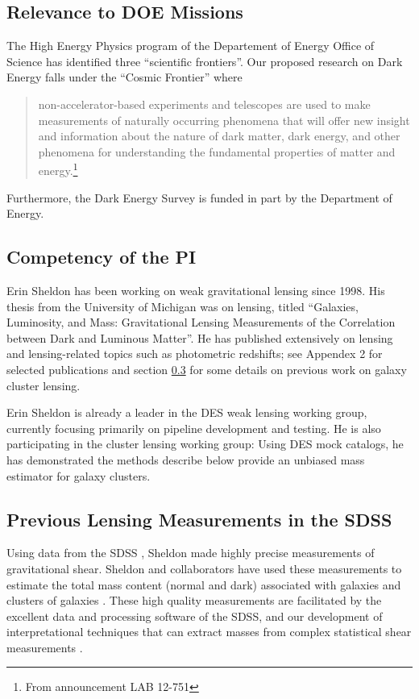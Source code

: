 \documentclass[12pt]{article}
\begin{document}
\subsection{Relevance to DOE Missions}

The High Energy Physics program of the Departement of Energy Office of Science
has identified three ``scientific frontiers''.  Our proposed research
on Dark Energy falls under the ``Cosmic Frontier'' where
\begin{quote} non-accelerator-based experiments and telescopes are used to make
    measurements of naturally occurring phenomena that will offer new insight
    and information about the nature of dark matter, dark energy, and other
    phenomena for understanding the fundamental properties of matter and
    energy.\footnote{From announcement LAB 12-751}
\end{quote}
Furthermore, the Dark Energy Survey is funded in part by the Department of
Energy.

\subsection{Competency of the PI}

Erin Sheldon has been working on weak gravitational lensing since 1998.  His
thesis from the University of Michigan was on lensing, titled ``Galaxies,
Luminosity, and Mass: Gravitational Lensing Measurements of the Correlation
between Dark and Luminous Matter''.  He has published extensively on lensing
and lensing-related topics such as photometric redshifts; see Appendex 2 for
selected publications and section \ref{sec:sdssold} for some details on
previous work on galaxy cluster lensing.

Erin Sheldon is already a leader in the DES weak lensing working group,
currently focusing primarily on pipeline development and testing.  He is also
participating in the cluster lensing working group: Using DES mock catalogs, he
has demonstrated the methods describe below provide an unbiased mass estimator
for galaxy clusters.

\subsection{Previous Lensing Measurements in the SDSS} \label{sec:sdssold}

Using data from the SDSS \cite{York00}, Sheldon made highly precise
measurements of gravitational shear. Sheldon and collaborators have used these
measurements to estimate the total mass content (normal and dark) associated
with galaxies and clusters of galaxies
\cite{fis00,Sheldon04,SheldonLensing07,JohnstonLensing07,SheldonM2L07}.  These
high quality measurements are facilitated by the excellent data and processing
software of the SDSS, and our development of interpretational techniques that
can extract masses from complex statistical shear measurements
\cite{JohnstonInvert07}.
\end{document}
